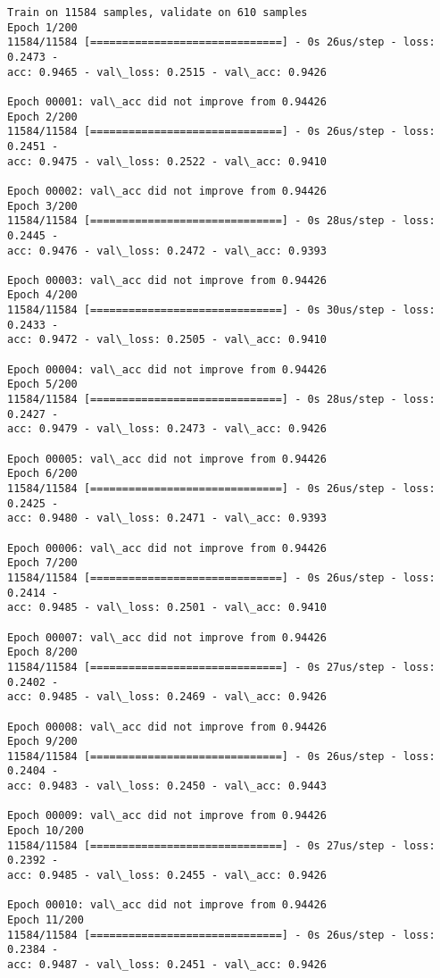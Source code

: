 \documentclass[11pt]{article}
\begin{document}
    \begin{Verbatim}[commandchars=\\\{\}]
Train on 11584 samples, validate on 610 samples
Epoch 1/200
11584/11584 [==============================] - 0s 26us/step - loss: 0.2473 -
acc: 0.9465 - val\_loss: 0.2515 - val\_acc: 0.9426

Epoch 00001: val\_acc did not improve from 0.94426
Epoch 2/200
11584/11584 [==============================] - 0s 26us/step - loss: 0.2451 -
acc: 0.9475 - val\_loss: 0.2522 - val\_acc: 0.9410

Epoch 00002: val\_acc did not improve from 0.94426
Epoch 3/200
11584/11584 [==============================] - 0s 28us/step - loss: 0.2445 -
acc: 0.9476 - val\_loss: 0.2472 - val\_acc: 0.9393

Epoch 00003: val\_acc did not improve from 0.94426
Epoch 4/200
11584/11584 [==============================] - 0s 30us/step - loss: 0.2433 -
acc: 0.9472 - val\_loss: 0.2505 - val\_acc: 0.9410

Epoch 00004: val\_acc did not improve from 0.94426
Epoch 5/200
11584/11584 [==============================] - 0s 28us/step - loss: 0.2427 -
acc: 0.9479 - val\_loss: 0.2473 - val\_acc: 0.9426

Epoch 00005: val\_acc did not improve from 0.94426
Epoch 6/200
11584/11584 [==============================] - 0s 26us/step - loss: 0.2425 -
acc: 0.9480 - val\_loss: 0.2471 - val\_acc: 0.9393

Epoch 00006: val\_acc did not improve from 0.94426
Epoch 7/200
11584/11584 [==============================] - 0s 26us/step - loss: 0.2414 -
acc: 0.9485 - val\_loss: 0.2501 - val\_acc: 0.9410

Epoch 00007: val\_acc did not improve from 0.94426
Epoch 8/200
11584/11584 [==============================] - 0s 27us/step - loss: 0.2402 -
acc: 0.9485 - val\_loss: 0.2469 - val\_acc: 0.9426

Epoch 00008: val\_acc did not improve from 0.94426
Epoch 9/200
11584/11584 [==============================] - 0s 26us/step - loss: 0.2404 -
acc: 0.9483 - val\_loss: 0.2450 - val\_acc: 0.9443

Epoch 00009: val\_acc did not improve from 0.94426
Epoch 10/200
11584/11584 [==============================] - 0s 27us/step - loss: 0.2392 -
acc: 0.9485 - val\_loss: 0.2455 - val\_acc: 0.9426

Epoch 00010: val\_acc did not improve from 0.94426
Epoch 11/200
11584/11584 [==============================] - 0s 26us/step - loss: 0.2384 -
acc: 0.9487 - val\_loss: 0.2451 - val\_acc: 0.9426


\end{Verbatim}
\end{document}

